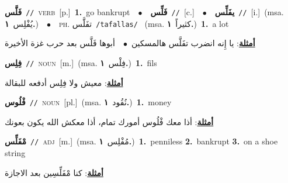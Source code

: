 \documentclass[10pt,a4paper,twoside]{article} %
\begin{document}
\begin{multicols}{2}
{\setlength\topsep{0pt}\textbf{\foreignlanguage{arabic}{فَلَّس}}\ {\color{gray}\texttt{//}\color{black}}\ \textsc{verb}\ [p.]\ \textbf{1.}~go bankrupt\ \ $\bullet$\ \ \setlength\topsep{0pt}\textbf{\foreignlanguage{arabic}{فَلِّس}}\ {\color{gray}\texttt{//}\color{black}}\ [c.]\ \ $\bullet$\ \ \setlength\topsep{0pt}\textbf{\foreignlanguage{arabic}{يفَلِّس}}\ {\color{gray}\texttt{//}\color{black}}\ [i.]\ \color{gray}(msa. \foreignlanguage{arabic}{يُفْلِس}~\foreignlanguage{arabic}{\textbf{١.}})\color{black}\ \ $\bullet$\ \ \textsc{ph.} \color{gray} \foreignlanguage{arabic}{تفَلَّس}\color{black}\ {\color{gray}\texttt{/{\sffamily tafallas}/}\color{black}}\ \color{gray} (msa. \foreignlanguage{arabic}{كثيراً}~\foreignlanguage{arabic}{\textbf{١.}})\color{black}\ \textbf{1.}~a lot\  \begin{flushright}\color{gray}\foreignlanguage{arabic}{\textbf{\underline{\foreignlanguage{arabic}{أمثلة}}}: يا إِنه انضرب تفَلَّس هالمسكين\ $\bullet$\ \  أبوها فَلَّس بعد حرب غزة الأخيرة}\end{flushright}\color{black}} \vspace{2mm}

{\setlength\topsep{0pt}\textbf{\foreignlanguage{arabic}{فِلِس}}\ {\color{gray}\texttt{//}\color{black}}\ \textsc{noun}\ [m.]\ \color{gray}(msa. \foreignlanguage{arabic}{فِلْس}~\foreignlanguage{arabic}{\textbf{١.}})\color{black}\ \textbf{1.}~fils\  \begin{flushright}\color{gray}\foreignlanguage{arabic}{\textbf{\underline{\foreignlanguage{arabic}{أمثلة}}}: معيش ولا فِلِس أدفعه للبقالة}\end{flushright}\color{black}} \vspace{2mm}

{\setlength\topsep{0pt}\textbf{\foreignlanguage{arabic}{فْلُوس}}\ {\color{gray}\texttt{//}\color{black}}\ \textsc{noun}\ [pl.]\ \color{gray}(msa. \foreignlanguage{arabic}{نُقُود}~\foreignlanguage{arabic}{\textbf{١.}})\color{black}\ \textbf{1.}~money\  \begin{flushright}\color{gray}\foreignlanguage{arabic}{\textbf{\underline{\foreignlanguage{arabic}{أمثلة}}}: أذا معك فْلُوس أمورك تمام، أذا معكش الله يكون بعونك}\end{flushright}\color{black}} \vspace{2mm}

{\setlength\topsep{0pt}\textbf{\foreignlanguage{arabic}{مْفَلِّس}}\ {\color{gray}\texttt{//}\color{black}}\ \textsc{adj}\ [m.]\ \color{gray}(msa. \foreignlanguage{arabic}{مُفْلِس}~\foreignlanguage{arabic}{\textbf{١.}})\color{black}\ \textbf{1.}~penniless  \textbf{2.}~bankrupt  \textbf{3.}~on a shoe string\  \begin{flushright}\color{gray}\foreignlanguage{arabic}{\textbf{\underline{\foreignlanguage{arabic}{أمثلة}}}: كنا مْفَلِّسِين بعد الاجازة}\end{flushright}\color{black}} \vspace{2mm}


\end{multicols}
\end{document}
